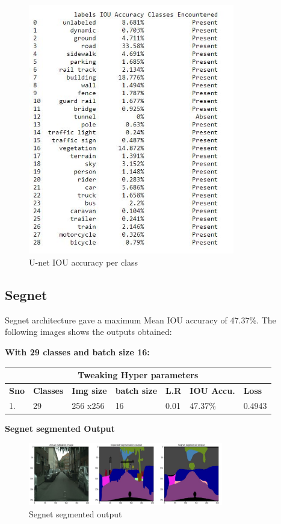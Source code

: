 \documentclass{IEEEtran}
\begin{document}
\begin{figure}[h]
    \centering
    \captionsetup{justification=centering}
    \includegraphics[width=9cm]{U-net-cityscrapes-B16-IOU-C29.JPG}
    \caption{U-net IOU accuracy per class}
    \label{fig:Binary class segmented output}
\end{figure}

\subsection{\textbf{Segnet}} Segnet architecture gave a maximum Mean IOU accuracy of 47.37\%. The following images shows the outputs obtained:

\textbf{With 29 classes and batch size 16:}
\newline

\begin{tabular}{ |p{0.6cm}|p{1.2cm}|p{0.6cm}|p{0.6cm}|p{0.6cm}|p{0.8cm}|p{0.8cm}|}
 \hline
 \multicolumn{7}{|c|}{\textbf{Tweaking Hyper parameters}} \\
 \hline
 \textbf{Sno} & \textbf{Classes} & \textbf{Img size} & \textbf{batch size} & \textbf{L.R} & \textbf{IOU Accu.} & \textbf{Loss} \\
 \hline
 1. & 29   & 256 x256   & 16  & 0.01 & 47.37\% & 0.4943 \\
 \hline
\end{tabular}
\textbf{Segnet segmented Output}

\begin{figure}[h]
    \centering
    \captionsetup{justification=centering}
    \includegraphics[width=8.5cm]{Segnet-cityscrapes-B16-im.JPG}
    \caption{Segnet segmented output}
    \label{fig:Binary class segmented output}
\end{figure}
\end{document}
